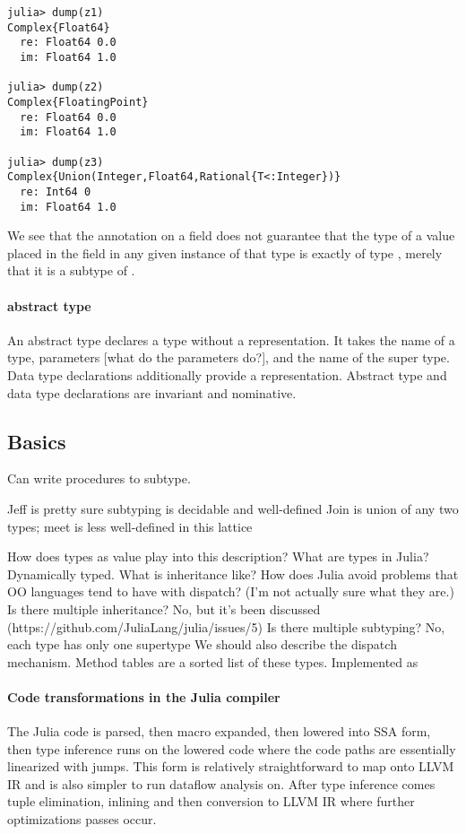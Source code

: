 \documentclass[pldi]{sigplanconf-pldi15}
\begin{document}
\begin{verbatim}
julia> dump(z1)
Complex{Float64} 
  re: Float64 0.0
  im: Float64 1.0

julia> dump(z2)
Complex{FloatingPoint} 
  re: Float64 0.0
  im: Float64 1.0

julia> dump(z3)
Complex{Union(Integer,Float64,Rational{T<:Integer})} 
  re: Int64 0
  im: Float64 1.0

\end{verbatim}

We see that the  annotation on a field does not guarantee that the
type of a value placed in the field in any given instance of that type is
exactly of type , merely that it is a subtype of .

\paragraph{abstract type}
An abstract type declares a type without a representation. It takes the name of
a type, parameters [what do the parameters do?], and the name of the super
type. Data type declarations additionally provide a representation.  Abstract type and data type declarations are
invariant and nominative.

\subsection{Basics}


Can write procedures to subtype.

Jeff is pretty sure subtyping is decidable and well-defined
Join is union of any two types; meet is less well-defined in this lattice

How does types as value play into this description?
What are types in Julia?
Dynamically typed.
What is inheritance like?
How does Julia avoid problems that OO languages tend to have with dispatch? (I'm not actually sure what they are.)
Is there multiple inheritance?
No, but it's been discussed (https://github.com/JuliaLang/julia/issues/5)
Is there multiple subtyping?
No, each type has only one supertype
We should also describe the dispatch mechanism.
Method tables are a sorted list of these types.
Implemented as 


\paragraph{Code transformations in the Julia compiler}
The Julia code is parsed, then macro expanded, then lowered into SSA form, then
type inference runs on the lowered code where the code paths are essentially
linearized with jumps. This form is relatively straightforward to map onto LLVM
IR and is also simpler to run dataflow analysis on. After type inference comes
tuple elimination, inlining and then conversion to LLVM IR where further
optimizations passes occur.
\end{document}
